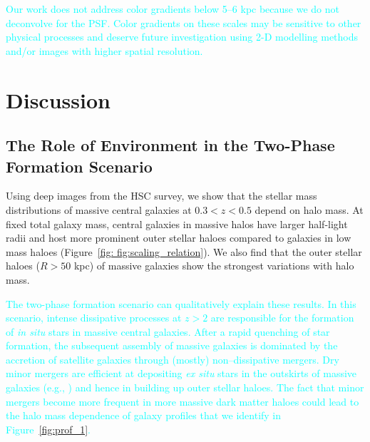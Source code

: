 \documentclass[a4paper,fleqn,usenatbib]{mnras}
\newcommand{\song}[1]{\textcolor{cyan}{#1}}
\begin{document}
    \song{
    Our work does not address color gradients below 5--6 kpc because we do not 
    deconvolve for the PSF. 
    Color gradients on these scales may be sensitive to other physical processes and 
    deserve future investigation using 2-D modelling methods and/or images with higher 
    spatial resolution.
    }
    
   

\section{Discussion}
    \label{sec:discussion}

\subsection{The Role of Environment in the Two-Phase Formation Scenario}
            
    Using deep images from the HSC survey, we show that the stellar mass distributions 
    of massive central galaxies at $0.3 < z < 0.5$ depend on halo mass. 
    At fixed total galaxy mass, central galaxies in massive halos have larger 
    half-light radii and host more prominent outer stellar haloes compared to galaxies 
    in low mass haloes (Figure~\ref{fig: fig:scaling_relation}). 
    We also find that the outer stellar haloes ($R>50$ kpc) of massive galaxies show 
    the strongest variations with halo mass. 
    
    \song{
    The two-phase formation scenario can qualitatively explain these results. 
    In this scenario, intense dissipative processes at $z > 2$ are responsible for the 
    formation of \textit{in situ} stars in massive central galaxies. 
    After a rapid quenching of star formation, the subsequent assembly of massive 
    galaxies is dominated by the accretion of satellite galaxies through (mostly) 
    non--dissipative mergers. 
    Dry minor mergers are efficient at depositing \textit{ex situ} stars in the 
    outskirts of massive galaxies (e.g., \citealt{Oogi2013, Bedorf2013}) and hence in 
    building up outer stellar haloes. 
    The fact that minor mergers become more frequent in more massive dark matter 
    haloes could lead to the halo mass dependence of galaxy profiles that we identify 
    in Figure~\ref{fig:prof_1}.
    }
      
\end{document}
